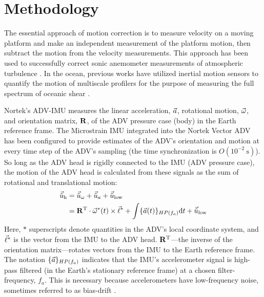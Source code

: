 
\section{Methodology}
\label{sec:methods}


\def\ue{\ensuremath{\vec{\tilde{u}}\earth}}


The essential approach of motion correction is to measure velocity on a moving platform and make an independent measurement of the platform motion, then subtract the motion from the velocity measurements. This approach has been used to successfully correct sonic anemometer measurements of atmospheric turbulence \cite[e.g., ][]{Edson++1998, Miller++2008}.  In the ocean, previous works have utilized inertial motion sensors to quantify the motion of multiscale profilers for the purpose of measuring the full spectrum of oceanic shear \cite[]{Winkel++1996}.

Nortek's ADV-IMU measures the linear acceleration, ${\vec{a}}$, rotational motion, $\vec{\omega}$, and orientation matrix, $\mathbf{R}$, of the ADV pressure case (body) in the Earth reference frame. The Microstrain IMU integrated into the Nortek Vector ADV has been configured to provide estimates of the ADV's orientation and motion at every time step of the ADV's sampling (the time synchronization is $O(10^{-2}\ \mathrm{s})$). So long as the ADV head is rigidly connected to the IMU (ADV pressure case), the motion of the ADV head is calculated from these signals as the sum of rotational and translational motion:
\begin{align}
  \label{eqn:uhead}
\begin{split}
  \uhead & = \urot + \uacc + \ulow \\
      & = \omatinv \cdot \AngRt^*(t)\times\l + \int \{\Accel(t)\}_{HP(f_{a})} \mathrm{d}t + \ulow
\end{split}
\end{align}
Here, $*$ superscripts denote quantities in the ADV's local coordinate system, and $\vec{\ell}^*$ is the vector from the IMU to the ADV head. $\mathbf{R}^\mathrm{T}$---the inverse of the orientation matrix---rotates vectors from the IMU to the Earth reference frame. The notation $\{{\vec{a}}\}_{HP(f_a)}$ indicates that the IMU's accelerometer signal is high-pass filtered (in the Earth's stationary reference frame) at a chosen filter-frequency, $f_a$. This is necessary because accelerometers have low-frequency noise, sometimes referred to as bias-drift \cite[]{Barshan+Whyte1995, Bevly2004, Gulmammadov2009}.


